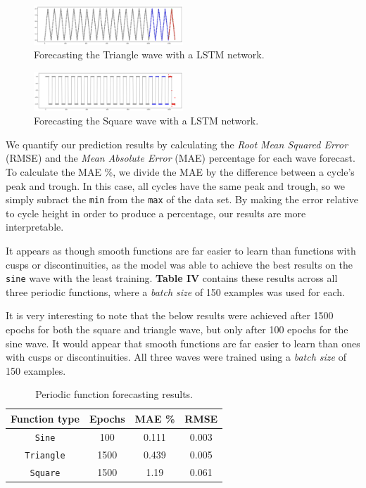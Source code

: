 \documentclass[letterpaper, 10 pt, conference]{ieeeconf}  %
\begin{document}
\label{TriangleForecasting}
\begin{figure}[h]
	\centering
	\includegraphics[width=0.5\textwidth]{assets/triangle_forecast.png}
    \caption{Forecasting the Triangle wave with a LSTM network.}
\end{figure}

\label{SquareForecasting}
\begin{figure}[h]
	\centering
	\includegraphics[width=0.5\textwidth]{assets/square_forecast.png}
    \caption{Forecasting the Square wave with a LSTM network.}
\end{figure}

We quantify our prediction results by calculating the \textit{Root Mean Squared Error} (RMSE) and the \textit{Mean Absolute Error} (MAE) percentage for each wave forecast. To calculate the MAE \%, we divide the MAE by the difference between a cycle's peak and trough. In this case, all cycles have the same peak and trough, so we simply subract the \texttt{min} from the \texttt{max} of the data set. By making the error relative to cycle height in order to produce a percentage, our results are more interpretable. 

It appears as though smooth functions are far easier to learn than functions with cusps or discontinuities, as the model was able to achieve the best results on the \texttt{sine} wave with the least training. \textbf{Table IV} contains these results across all three periodic functions, where a \textit{batch size} of 150 examples was used for each. 

It is very interesting to note that the below results were achieved after 1500 epochs for both the square and triangle wave, but only after 100 epochs for the sine wave. It would appear that smooth functions are far easier to learn than ones with cusps or discontinuities. All three waves were trained using a \textit{batch size} of 150 examples.

\label{PeriodicResults}
\begin{table}[h!] %
  \centering
  \begin{tabular}{ c | c c c }
      Function type & Epochs & MAE \% & RMSE  \\
      \hline
      \verb|Sine| & 100 & 0.111  & 0.003 \\
      \verb|Triangle| & 1500 & 0.439 & 0.005\\
      \verb|Square| & 1500 &1.19 & 0.061

  \end{tabular}
  \caption{Periodic function forecasting results.}
\end{table}
\end{document}
